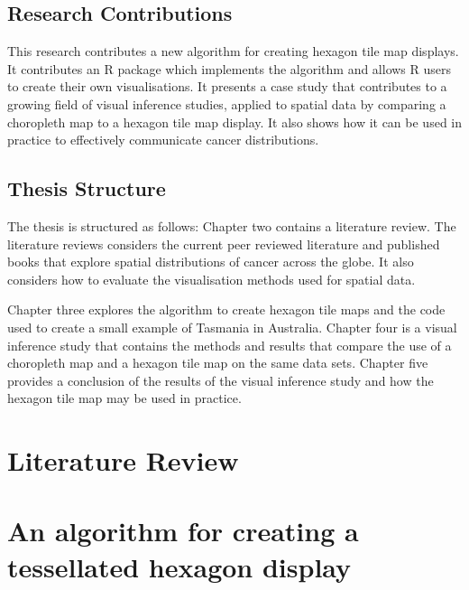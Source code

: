 \documentclass{monashthesis}
\begin{document}
\hypertarget{research-contributions}{%
\section{Research Contributions}\label{research-contributions}}

This research contributes a new algorithm for creating hexagon tile map displays. It contributes an R \autocite{R} package which implements the algorithm and allows R users to create their own visualisations.
It presents a case study that contributes to a growing field of visual inference studies, applied to spatial data by comparing a choropleth map to a hexagon tile map display.
It also shows how it can be used in practice to effectively communicate cancer distributions.

\hypertarget{thesis-structure}{%
\section{Thesis Structure}\label{thesis-structure}}

The thesis is structured as follows: Chapter two contains a literature review.
The literature reviews considers the current peer reviewed literature and published books that explore spatial distributions of cancer across the globe.
It also considers how to evaluate the visualisation methods used for spatial data.

Chapter three explores the algorithm to create hexagon tile maps and the code used to create a small example of Tasmania in Australia.
Chapter four is a visual inference study that contains the methods and results that compare the use of a choropleth map and a hexagon tile map on the same data sets.
Chapter five provides a conclusion of the results of the visual inference study and how the hexagon tile map may be used in practice.

\hypertarget{ch:literature}{%
\chapter{Literature Review}\label{ch:literature}}





\hypertarget{ch:algorithm}{%
\chapter{An algorithm for creating a tessellated hexagon display}\label{ch:algorithm}}
\end{document}
